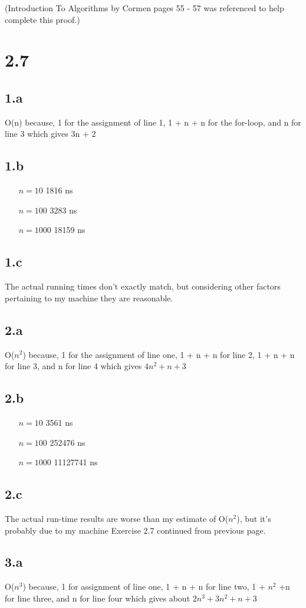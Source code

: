\documentclass[12pt,letterpaper]{article}
\begin{document}
\scriptsize (Introduction To Algorithms by Cormen pages 55 - 57 was referenced to help complete this proof.)\small
\newpage
\section*{2.7}
\subsection*{1.a}
O(n) because, 1 for the assignment of line 1, 1 + n + n for the for-loop, and n for line 3 which gives 3n + 2
\subsection*{1.b}
\begin{itemize}
\item[$n=10$] 1816 ns
\item[$n=100$] 3283 ns
\item[$n=1000$] 18159 ns
\end{itemize}
\subsection*{1.c}
The actual running times don't exactly match, but considering other factors pertaining to my machine they are reasonable.
\subsection*{2.a}
O($n^2$) because, 1 for the assignment of line one, 1 + n + n for line 2, 1 + n + n for line 3, and n for line 4 which gives $4n^2 + n + 3$
\subsection*{2.b}
\begin{itemize}
\item[$n=10$] 3561 ns
\item[$n=100$] 252476 ns
\item[$n=1000$] 11127741 ns
\end{itemize}
\subsection*{2.c}
The actual run-time results are worse than my estimate of O($n^2$), but it's probably due to my machine
\newpage
Exercise 2.7 continued from previous page.
\subsection*{3.a}
O($n^3$) because, 1 for assignment of line one, 1 + n + n for line two, 1 + $n^2$ +n for line three, and n for line four which gives about $2n^3 + 3n^2 + n + 3$
\end{document}

